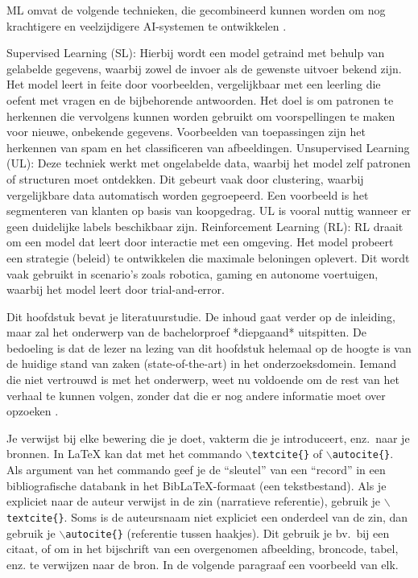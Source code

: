 ML omvat de volgende technieken, die gecombineerd kunnen worden om nog krachtigere en veelzijdigere AI-systemen te ontwikkelen \autocite{Kouassi2023}. 

Supervised Learning (SL): Hierbij wordt een model getraind met behulp van gelabelde gegevens, waarbij zowel de invoer als de gewenste uitvoer bekend zijn. Het model leert in feite door voorbeelden, vergelijkbaar met een leerling die oefent met vragen en de bijbehorende antwoorden. Het doel is om patronen te herkennen die vervolgens kunnen worden gebruikt om voorspellingen te maken voor nieuwe, onbekende gegevens. Voorbeelden van toepassingen zijn het herkennen van spam en het classificeren van afbeeldingen.
Unsupervised Learning (UL): Deze techniek werkt met ongelabelde data, waarbij het model zelf patronen of structuren moet ontdekken. Dit gebeurt vaak door clustering, waarbij vergelijkbare data automatisch worden gegroepeerd. Een voorbeeld is het segmenteren van klanten op basis van koopgedrag. UL is vooral nuttig wanneer er geen duidelijke labels beschikbaar zijn. 
Reinforcement Learning (RL): RL draait om een model dat leert door interactie met een omgeving. Het model probeert een strategie (beleid) te ontwikkelen die maximale beloningen oplevert. Dit wordt vaak gebruikt in scenario's zoals robotica, gaming en autonome voertuigen, waarbij het model leert door trial-and-error. 


Dit hoofdstuk bevat je literatuurstudie. De inhoud gaat verder op de inleiding, maar zal het onderwerp van de bachelorproef *diepgaand* uitspitten. De bedoeling is dat de lezer na lezing van dit hoofdstuk helemaal op de hoogte is van de huidige stand van zaken (state-of-the-art) in het onderzoeksdomein. Iemand die niet vertrouwd is met het onderwerp, weet nu voldoende om de rest van het verhaal te kunnen volgen, zonder dat die er nog andere informatie moet over opzoeken \autocite{Pollefliet2011}.

Je verwijst bij elke bewering die je doet, vakterm die je introduceert, enz.\ naar je bronnen. In \LaTeX{} kan dat met het commando \texttt{$\backslash${textcite\{\}}} of \texttt{$\backslash${autocite\{\}}}. Als argument van het commando geef je de ``sleutel'' van een ``record'' in een bibliografische databank in het Bib\LaTeX{}-formaat (een tekstbestand). Als je expliciet naar de auteur verwijst in de zin (narratieve referentie), gebruik je \texttt{$\backslash${}textcite\{\}}. Soms is de auteursnaam niet expliciet een onderdeel van de zin, dan gebruik je \texttt{$\backslash${}autocite\{\}} (referentie tussen haakjes). Dit gebruik je bv.~bij een citaat, of om in het bijschrift van een overgenomen afbeelding, broncode, tabel, enz. te verwijzen naar de bron. In de volgende paragraaf een voorbeeld van elk.

